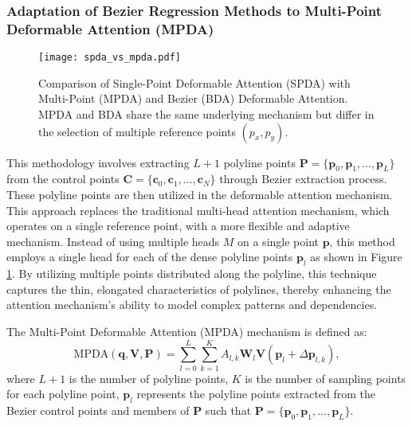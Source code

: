 \subsubsection{Adaptation of Bezier Regression Methods to Multi-Point Deformable Attention (MPDA)}

\begin{figure}[tb]
  \centering
  \texttt{[image: spda\_vs\_mpda.pdf]}
  \caption{Comparison of Single-Point Deformable Attention (SPDA) with Multi-Point (MPDA) and Bezier (BDA) Deformable Attention. MPDA and BDA share the same underlying mechanism but differ in the selection of multiple reference points $(p_x,p_y)$.}
  \label{fig: spda_vs_mpda}
\end{figure}

This methodology involves extracting \( L+1 \) polyline points $\mathbf{P} = \{\mathbf{p}_0, \mathbf{p}_1, \ldots, \mathbf{p}_L\}$ from the control points $\mathbf{C} = \{\mathbf{c}_0, \mathbf{c}_1, \ldots, \mathbf{c}_N\}$ through Bezier extraction process. These polyline points are then utilized in the deformable attention mechanism. This approach replaces the traditional multi-head attention mechanism, which operates on a single reference point, with a more flexible and adaptive mechanism. Instead of using multiple heads \( M \) on a single point \( \mathbf{p} \), this method employs a single head for each of the dense polyline points \( \mathbf{p}_l \) as shown in Figure \ref{fig: spda_vs_mpda}. By utilizing multiple points distributed along the polyline, this technique captures the thin, elongated characteristics of polylines, thereby enhancing the attention mechanism's ability to model complex patterns and dependencies.

The Multi-Point Deformable Attention (MPDA) mechanism is defined as:
\begin{equation}
\text{MPDA}(\mathbf{q}, \mathbf{V}, \mathbf{P}) = \sum_{l=0}^{L} \sum_{k=1}^{K} A_{l,k} \mathbf{W}_l \mathbf{V}(\mathbf{p}_l + \Delta \mathbf{p}_{l,k}),
\end{equation}
where \( L+1 \) is the number of polyline points, \( K \) is the number of sampling points for each polyline point, \( \mathbf{p}_l \) represents the polyline points extracted from the Bezier control points and members of \( \mathbf{P} \) such that $\mathbf{P} = \{\mathbf{p}_0, \mathbf{p}_1, \ldots, \mathbf{p}_L\}$. 

